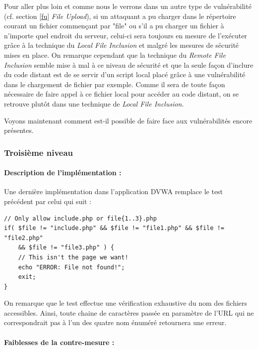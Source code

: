 Pour aller plus loin et comme nous le verrons dans un autre type de vulnérabilité (cf. section \ref{fu} \textit{File Upload}), si un attaquant a pu charger dans le répertoire courant un fichier commençant par "file" ou s'il a pu charger un fichier à n'importe quel endroit du serveur, celui-ci sera toujours en mesure de l'exécuter grâce à la technique du \textit{Local File Inclusion} et malgré les mesures de sécurité mises en place. On remarque cependant que la technique du \textit{Remote File Inclusion} semble mise à mal à ce niveau de sécurité et que la seule façon d'inclure du code distant est de se servir d'un script local placé grâce à une vulnérabilité dans le chargement de fichier par exemple. Comme il sera de toute façon nécessaire de faire appel à ce fichier local pour accéder au code distant, on se retrouve plutôt dans une technique de \textit{Local File Inclusion}. 

Voyons maintenant comment est-il possible de faire face aux vulnérabilités encore présentes.

\subsubsection{Troisième niveau}

\paragraph{Description de l'implémentation :}

Une dernière implémentation dans l'application DVWA remplace le test précédent par celui qui suit :

\begin{lstlisting}
// Only allow include.php or file{1..3}.php
if( $file != "include.php" && $file != "file1.php" && $file != "file2.php" 
    && $file != "file3.php" ) {
    // This isn't the page we want!
    echo "ERROR: File not found!";
    exit;
}
\end{lstlisting}

On remarque que le test effectue une vérification exhaustive du nom des fichiers accessibles. Ainsi, toute chaine de caractères passée en paramètre de l'URL qui ne correspondrait pas à l'un des quatre nom énuméré retournera une erreur.

\paragraph{Faiblesses de la contre-mesure :}

